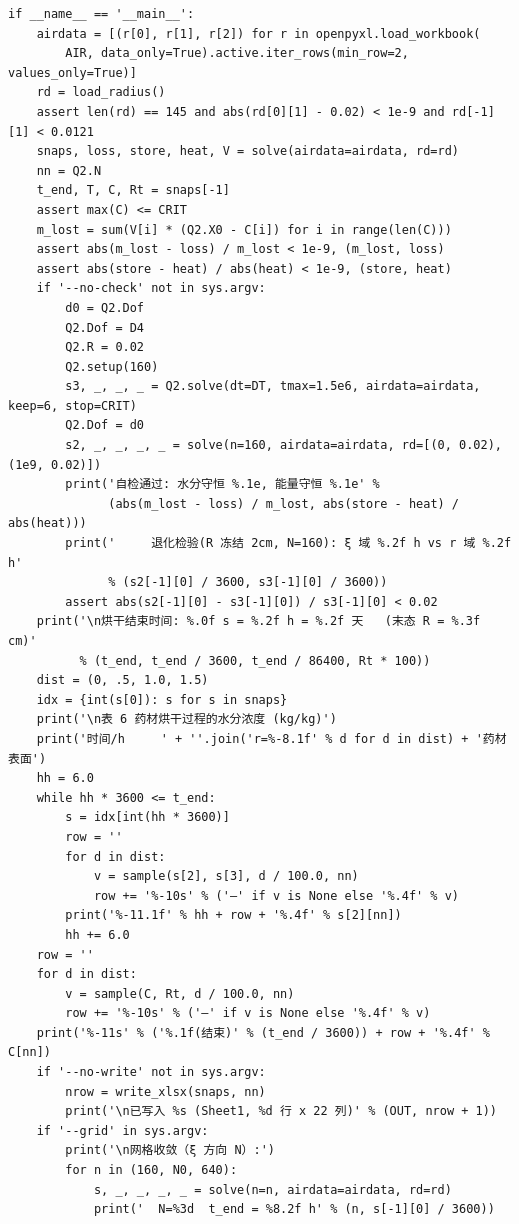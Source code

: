 \documentclass[12pt,a4paper]{article}
\begin{document}
\begin{lstlisting}
if __name__ == '__main__':
    airdata = [(r[0], r[1], r[2]) for r in openpyxl.load_workbook(
        AIR, data_only=True).active.iter_rows(min_row=2, values_only=True)]
    rd = load_radius()
    assert len(rd) == 145 and abs(rd[0][1] - 0.02) < 1e-9 and rd[-1][1] < 0.0121
    snaps, loss, store, heat, V = solve(airdata=airdata, rd=rd)
    nn = Q2.N                        
    t_end, T, C, Rt = snaps[-1]
    assert max(C) <= CRIT
    m_lost = sum(V[i] * (Q2.X0 - C[i]) for i in range(len(C)))
    assert abs(m_lost - loss) / m_lost < 1e-9, (m_lost, loss)
    assert abs(store - heat) / abs(heat) < 1e-9, (store, heat)
    if '--no-check' not in sys.argv:
        d0 = Q2.Dof
        Q2.Dof = D4                                 
        Q2.R = 0.02
        Q2.setup(160)
        s3, _, _, _ = Q2.solve(dt=DT, tmax=1.5e6, airdata=airdata, keep=6, stop=CRIT)
        Q2.Dof = d0
        s2, _, _, _, _ = solve(n=160, airdata=airdata, rd=[(0, 0.02), (1e9, 0.02)])
        print('自检通过: 水分守恒 %.1e, 能量守恒 %.1e' %
              (abs(m_lost - loss) / m_lost, abs(store - heat) / abs(heat)))
        print('     退化检验(R 冻结 2cm, N=160): ξ 域 %.2f h vs r 域 %.2f h'
              % (s2[-1][0] / 3600, s3[-1][0] / 3600))
        assert abs(s2[-1][0] - s3[-1][0]) / s3[-1][0] < 0.02
    print('\n烘干结束时间: %.0f s = %.2f h = %.2f 天   (末态 R = %.3f cm)'
          % (t_end, t_end / 3600, t_end / 86400, Rt * 100))
    dist = (0, .5, 1.0, 1.5)
    idx = {int(s[0]): s for s in snaps}
    print('\n表 6 药材烘干过程的水分浓度 (kg/kg)')
    print('时间/h     ' + ''.join('r=%-8.1f' % d for d in dist) + '药材表面')
    hh = 6.0
    while hh * 3600 <= t_end:
        s = idx[int(hh * 3600)]
        row = ''
        for d in dist:
            v = sample(s[2], s[3], d / 100.0, nn)
            row += '%-10s' % ('—' if v is None else '%.4f' % v)
        print('%-11.1f' % hh + row + '%.4f' % s[2][nn])
        hh += 6.0
    row = ''
    for d in dist:
        v = sample(C, Rt, d / 100.0, nn)
        row += '%-10s' % ('—' if v is None else '%.4f' % v)
    print('%-11s' % ('%.1f(结束)' % (t_end / 3600)) + row + '%.4f' % C[nn])
    if '--no-write' not in sys.argv:
        nrow = write_xlsx(snaps, nn)
        print('\n已写入 %s (Sheet1, %d 行 x 22 列)' % (OUT, nrow + 1))
    if '--grid' in sys.argv:
        print('\n网格收敛（ξ 方向 N）:')
        for n in (160, N0, 640):
            s, _, _, _, _ = solve(n=n, airdata=airdata, rd=rd)
            print('  N=%3d  t_end = %8.2f h' % (n, s[-1][0] / 3600))
\end{lstlisting}
	
	
\end{document}

